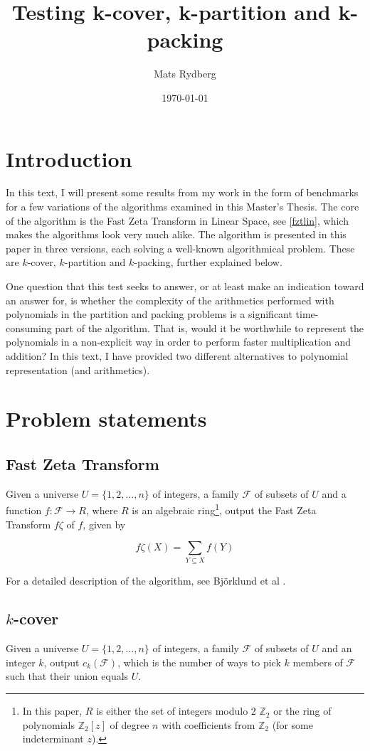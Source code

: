 \documentclass[a4paper, titlepage]{article}
\title{\huge{Testing k-cover, k-partition and k-packing}}
\author{Mats Rydberg}
\date{\today}
\begin{document}
\maketitle

\section{Introduction}
In this text, I will present some results from my work in the form of benchmarks for a few variations of the algorithms examined in this Master's Thesis. The core of the algorithm is the Fast Zeta Transform in Linear Space, see \ref{fztlin}, which makes the algorithms look very much alike. The algorithm is presented in this paper in three versions, each solving a well-known algorithmical problem. These are $k$-cover, $k$-partition and $k$-packing, further explained below.

One question that this test seeks to answer, or at least make an indication toward an answer for, is whether the complexity of the arithmetics performed with polynomials in the partition and packing problems is a significant time-consuming part of the algorithm. That is, would it be worthwhile to represent the polynomials in a non-explicit way in order to perform faster multiplication and addition? In this text, I have provided two different alternatives to polynomial representation (and arithmetics).

\section{Problem statements}

\subsection{Fast Zeta Transform}
Given a universe $U = \{1, 2, \ldots, n\}$ of integers, a family $\mathcal{F}$ of subsets of $U$ and a function $f: \mathcal{F} \rightarrow R$, where $R$ is an algebraic ring\footnote{In this paper, $R$ is either the set of integers modulo 2 $\mathbb{Z}_2$ or the ring of polynomials $\mathbb{Z}_2[z]$ of degree $n$ with coefficients from $\mathbb{Z}_2$ (for some indeterminant $z$).}, output the Fast Zeta Transform $f\zeta$ of $f$, given by

$$
f\zeta (X) = \sum_{Y\subseteq X}f(Y)
$$

For a detailed description of the algorithm, see Björklund et al \cite{cov_pack}.

\subsection{$k$-cover}
Given a universe $U = \{1, 2, \ldots, n\}$ of integers, a family $\mathcal{F}$ of subsets of $U$ and an integer $k$, output $c_k(\mathcal{F})$, which is the number of ways to pick $k$ members of $\mathcal{F}$ such that their union equals $U$.
\end{document}
